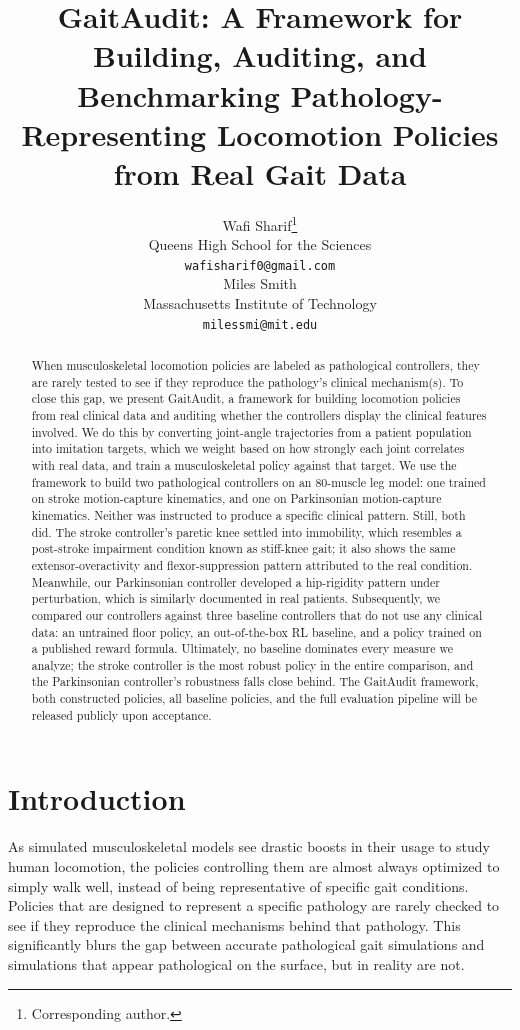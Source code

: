 \documentclass{article}
\title{GaitAudit: A Framework for Building, Auditing, and Benchmarking Pathology-Representing Locomotion Policies from Real Gait Data}
\author{
  Wafi Sharif\thanks{Corresponding author.} \\
  Queens High School for the Sciences \\
  \texttt{wafisharif0@gmail.com} \\
  \And
  Miles Smith \\
  Massachusetts Institute of Technology \\
  \texttt{milessmi@mit.edu}
}
\begin{document}
\maketitle

\begin{abstract}
When musculoskeletal locomotion policies are labeled as pathological controllers, they are rarely tested to see if they reproduce the pathology's clinical mechanism(s). To close this gap, we present GaitAudit, a framework for building locomotion policies from real clinical data and auditing whether the controllers display the clinical features involved. We do this by converting joint-angle trajectories from a patient population into imitation targets, which we weight based on how strongly each joint correlates with real data, and train a musculoskeletal policy against that target. We use the framework to build two pathological controllers on an 80-muscle leg model: one trained on stroke motion-capture kinematics, and one on Parkinsonian motion-capture kinematics. Neither was instructed to produce a specific clinical pattern. Still, both did. The stroke controller's paretic knee settled into immobility, which resembles a post-stroke impairment condition known as stiff-knee gait; it also shows the same extensor-overactivity and flexor-suppression pattern attributed to the real condition. Meanwhile, our Parkinsonian controller developed a hip-rigidity pattern under perturbation, which is similarly documented in real patients. Subsequently, we compared our controllers against three baseline controllers that do not use any clinical data: an untrained floor policy, an out-of-the-box RL baseline, and a policy trained on a published reward formula. Ultimately, no baseline dominates every measure we analyze; the stroke controller is the most robust policy in the entire comparison, and the Parkinsonian controller's robustness falls close behind. The GaitAudit framework, both constructed policies, all baseline policies, and the full evaluation pipeline will be released publicly upon acceptance.
\end{abstract}

\section{Introduction}

As simulated musculoskeletal models see drastic boosts in their usage to study human locomotion, the policies controlling them are almost always optimized to simply walk well, instead of being representative of specific gait conditions. Policies that are designed to represent a specific pathology are rarely checked to see if they reproduce the clinical mechanisms behind that pathology. This significantly blurs the gap between accurate pathological gait simulations and simulations that appear pathological on the surface, but in reality are not.
\end{document}
